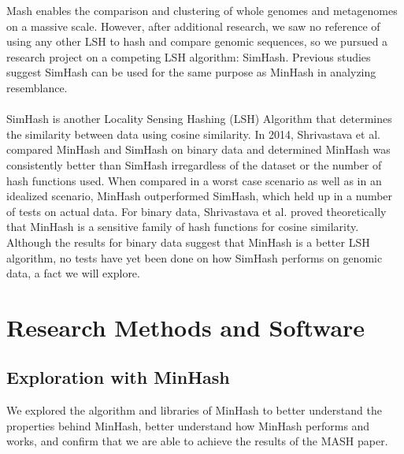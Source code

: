 \documentclass[12pt, letterpaper]{article}
\begin{document}
Mash enables the comparison and clustering of whole genomes and metagenomes on a massive scale. However, after additional research, we saw no reference of using any other LSH to hash and compare genomic sequences, so we pursued a research project on a competing LSH algorithm: SimHash. Previous studies suggest SimHash can be used for the same purpose as MinHash in analyzing resemblance. \\ \\
SimHash is another Locality Sensing Hashing (LSH) Algorithm that determines the similarity between data using cosine similarity. In 2014, Shrivastava et al. compared MinHash and SimHash on binary data and determined MinHash was consistently better than SimHash irregardless of the dataset or the number of hash functions used.\cite{MinvsSim} When compared in a worst case scenario as well as in an idealized scenario, MinHash outperformed SimHash, which held up in a number of tests on actual data. For binary data, Shrivastava et al. proved theoretically that MinHash is a sensitive family of hash functions for cosine similarity. Although the results for binary data suggest that MinHash is a better LSH algorithm, no tests have yet been done on how SimHash performs on genomic data, a fact we will explore.

\section{Research Methods and Software}

\subsection{Exploration with MinHash}

We explored the algorithm and libraries of MinHash to better understand the properties behind MinHash, better understand how MinHash performs and works, and confirm that we are able to achieve the results of the MASH paper.
\end{document}

